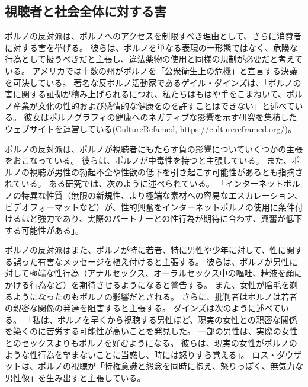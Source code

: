 \documentclass[paper=a4,book,openany]{jlreq} \usepackage{mystyle}
\begin{document}
\subsection{視聴者と社会全体に対する害}

ポルノの反対派は、ポルノへのアクセスを制限すべき理由として、さらに消費者に対する害を挙げる。
彼らは、ポルノを単なる表現の一形態ではなく、危険な行為として扱うべきだと主張し、違法薬物の使用と同様の規制が必要だと考えている。
アメリカでは十数の州がポルノを「公衆衛生上の危機」と宣言する決議を可決している\citep{quinn19:_is_porn_public_healt_crisis}。
著名な反ポルノ活動家であるゲイル・ダインズは、「ポルノの害に関する証拠が積み上げられるにつれ、私たちはもはや手をこまねいて、ポルノ産業が文化の性的および感情的な健康をのを許すことはできない」と述べている\citep{dines16:_why_porn_is_public_healt_issue}。
彼女はポルノグラフィの健康へのネガティブな影響を示す研究を集積したウェブサイトを運営している(CultureRefamed, \url{https://culturereframed.org/})。

ポルノの反対派は、ポルノが視聴者にもたらす負の影響についていくつかの主張をおこなっている。
彼らは、ポルノが中毒性を持つと主張している\citep{snagowski15:_implic_assoc_cyber_addic}。
また、ポルノの視聴が男性の勃起不全や性欲の低下を引き起こす可能性があるとも指摘されている。
ある研究では、次のように述べられている。
「インターネットポルノの特異な性質（無限の新規性、より極端な素材への容易なエスカレーション、ビデオフォーマットなど）が、性的興奮をインターネットポルノの使用に条件付けるほど強力であり、実際のパートナーとの性行為が期待に合わず、興奮が低下する可能性がある」\citep[p.1]{park16:_is_inter_pornog_causin_sexual_dysfun}。

ポルノの反対派はまた、ポルノが特に若者、特に男性や少年に対して、性に関する誤った有害なメッセージを植え付けると主張する。
彼らは、ポルノが男性に対して極端な性行為（アナルセックス、オーラルセックス中の嘔吐、精液を顔にかける行為など）を期待させるようになると警告する。
また、女性が陰毛を剃るようになったのもポルノの影響だとされる\citep{fetters11:_new_full_front}。
さらに、批判者はポルノは若者の親密な関係の発達を阻害すると主張する。
ダインズは次のように述べている。
「私は、ポルノを早くから視聴する男性ほど、現実の女性との親密な関係を築くのに苦労する可能性が高いことを発見した。
一部の男性は、実際の女性とのセックスよりもポルノを好むようになる。
彼らは、現実の女性がポルノのような性行為を望まないことに当惑し、時には怒りすら覚える」\citep{bindel10:_truth_porn_indus}。
ロス・ダウザットは、ポルノの視聴が「特権意識と怨念を同時に抱え、怒りっぽく、無気力な男性像」を生み出すと主張している\citep{douthat18:_lets_ban_porn}。
\end{document}
